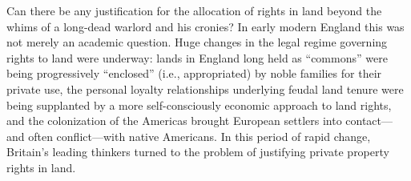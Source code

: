 Can there be any justification for the allocation of rights in land beyond the
whims of a long-dead warlord and his cronies? In early modern England this was
not merely an academic question. Huge changes in the legal regime governing
rights to land were underway: lands in England long held as ``commons'' were
being progressively ``enclosed'' (i.e., appropriated) by noble families for
their private use, the personal loyalty relationships underlying feudal land
tenure were being supplanted by a more self-consciously economic approach to
land rights, and the colonization of the Americas brought European settlers into
contact---and often conflict---with native Americans. In this period of rapid
change, Britain's leading thinkers turned to the problem of justifying private
property rights in land.

